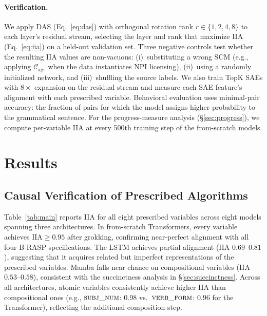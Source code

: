 \documentclass[11pt]{article}
\begin{document}
\paragraph{Verification.}
We apply DAS (Eq.~\ref{eq:das}) with orthogonal rotation rank $r \in \{1,2,4,8\}$ to each layer's residual stream, selecting the layer and rank that maximize IIA (Eq.~\ref{eq:iia}) on a held-out validation set.
Three negative controls test whether the resulting IIA values are non-vacuous: (i)~substituting a wrong SCM (e.g., applying $\mathcal{C}_\text{agr}$ when the data instantiates NPI licensing), (ii)~using a randomly initialized network, and (iii)~shuffling the source labels.
We also train TopK SAEs with $8{\times}$ expansion on the residual stream and measure each SAE feature's alignment with each prescribed variable.
Behavioral evaluation uses minimal-pair accuracy: the fraction of pairs for which the model assigns higher probability to the grammatical sentence.
For the progress-measure analysis (\S\ref{sec:progress}), we compute per-variable IIA at every 500th training step of the from-scratch models.

\section{Results}
\label{sec:results}

\subsection{Causal Verification of Prescribed Algorithms}
\label{sec:main-results}

Table~\ref{tab:main} reports IIA for all eight prescribed variables across eight models spanning three architectures.
In from-scratch Transformers, every variable achieves $\mathrm{IIA} \geq 0.95$ after grokking, confirming near-perfect alignment with all four B-RASP specifications.
The LSTM achieves partial alignment (IIA $0.69$--$0.81$), suggesting that it acquires related but imperfect representations of the prescribed variables.
Mamba falls near chance on compositional variables (IIA $0.53$--$0.58$), consistent with the succinctness analysis in \S\ref{sec:succinctness}.
Across all architectures, atomic variables consistently achieve higher IIA than compositional ones (e.g., $\textsc{subj\_num}$: $0.98$ vs.\ $\textsc{verb\_form}$: $0.96$ for the Transformer), reflecting the additional composition step.
\end{document}
